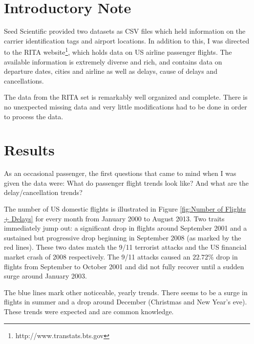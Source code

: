 \documentclass[11pt,twoside,titlepage]{article}
\begin{document}
\section{Introductory Note}

Seed Scientific provided two datasets as CSV files which held information on the carrier identification tags and airport locations. In addition to this, I was directed to the RITA website\footnote{http://www.transtats.bts.gov}, which holds data on US airline passenger flights. The available information is extremely diverse and rich, and contains data on departure dates, cities and airline as well as delays, cause of delays and cancellations.

The data from the RITA set is remarkably well organized and complete. There is no unexpected missing data and very little modifications had to be done in order to process the data.

\section{Results}

As an occasional passenger, the first questions that came to mind when I was given the data were: What do passenger flight trends look like? And what are the delay/cancellation trends? 

The number of US domestic flights is illustrated in Figure \ref{fig:Number of Flights + Delays} for every month from January 2000 to August 2013. Two traits immediately jump out: a significant drop in flights around September 2001 and a sustained but progressive drop beginning in September 2008 (as marked by the red lines). These two dates match the 9/11 terrorist attacks and the US financial market crash of 2008 respectively. The 9/11 attacks caused an $22.72\%$ drop in flights from September to October 2001 and did not fully recover until a sudden surge around January 2003.

The blue lines mark other noticeable, yearly trends. There seems to be a surge in flights in summer and a drop around December (Christmas and New Year's eve). These trends were expected and are common knowledge.
\end{document}
